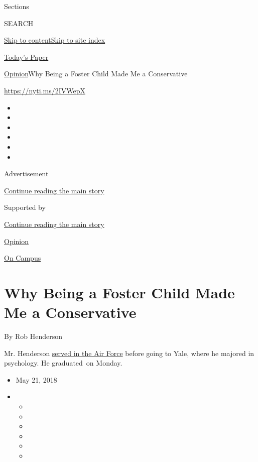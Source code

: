 Sections

SEARCH

\protect\hyperlink{site-content}{Skip to
content}\protect\hyperlink{site-index}{Skip to site index}

\href{https://myaccount.nytimes3xbfgragh.onion/auth/login?response_type=cookie\&client_id=vi}{}

\href{https://www.nytimes3xbfgragh.onion/section/todayspaper}{Today's
Paper}

\href{/section/opinion}{Opinion}\textbar{}Why Being a Foster Child Made
Me a Conservative

\url{https://nyti.ms/2IVWepX}

\begin{itemize}
\item
\item
\item
\item
\item
\item
\end{itemize}

Advertisement

\protect\hyperlink{after-top}{Continue reading the main story}

Supported by

\protect\hyperlink{after-sponsor}{Continue reading the main story}

\href{/section/opinion}{Opinion}

\href{/column/on-campus}{On Campus}

\hypertarget{why-being-a-foster-child-made-me-a-conservative}{%
\section{Why Being a Foster Child Made Me a
Conservative}\label{why-being-a-foster-child-made-me-a-conservative}}

By Rob Henderson

Mr. Henderson
\href{https://news.yale.edu/2018/05/14/senior-arrived-air-force-vet-and-graduates-gates-cambridge-scholar}{served
in the Air Force} before going to Yale, where he majored in psychology.
He graduated~on Monday.

\begin{itemize}
\item
  May 21, 2018
\item
  \begin{itemize}
  \item
  \item
  \item
  \item
  \item
  \item
  \end{itemize}
\end{itemize}

